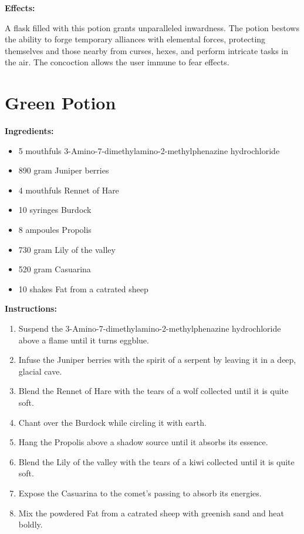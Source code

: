 \documentclass{article}
\begin{document}
\textbf{Effects:}

A flask filled with this potion grants unparalleled inwardness. The potion bestows the ability to forge temporary alliances with elemental forces, protecting themselves and those nearby from curses, hexes, and perform intricate tasks in the air. The concoction allows the user immune to fear effects.

\newpage
\section*{Green Potion}

\textbf{Ingredients:}

\begin{itemize}
  \item 5 mouthfuls 3-Amino-7-dimethylamino-2-methylphenazine hydrochloride
  \item 890 gram Juniper berries
  \item 4 mouthfuls Rennet of Hare
  \item 10 syringes Burdock
  \item 8 ampoules Propolis
  \item 730 gram Lily of the valley
  \item 520 gram Casuarina
  \item 10 shakes Fat from a catrated sheep
\end{itemize}

\textbf{Instructions:}

\begin{enumerate}
  \item Suspend the 3-Amino-7-dimethylamino-2-methylphenazine hydrochloride above a flame until it turns eggblue.
  \item Infuse the Juniper berries with the spirit of a serpent by leaving it in a deep, glacial cave.
  \item Blend the Rennet of Hare with the tears of a wolf collected until it is quite soft.
  \item Chant over the Burdock while circling it with earth.
  \item Hang the Propolis above a shadow source until it absorbs its essence.
  \item Blend the Lily of the valley with the tears of a kiwi collected until it is quite soft.
  \item Expose the Casuarina to the comet’s passing to absorb its energies.
  \item Mix the powdered Fat from a catrated sheep with greenish sand and heat boldly.
\end{enumerate}
\end{document}
